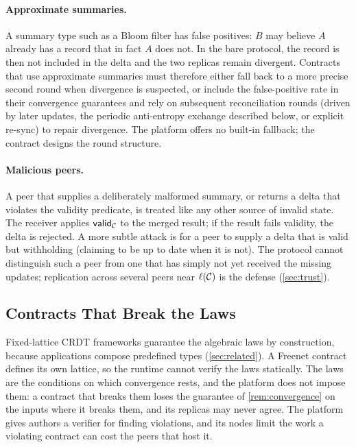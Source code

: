 \paragraph{Approximate summaries.} A summary type such as a Bloom filter has false positives: $B$ may believe $A$ already has a record that in fact $A$ does not. In the bare protocol, the record is then not included in the delta and the two replicas remain divergent. Contracts that use approximate summaries must therefore either fall back to a more precise second round when divergence is suspected, or include the false-positive rate in their convergence guarantees and rely on subsequent reconciliation rounds (driven by later updates, the periodic anti-entropy exchange described below, or explicit re-sync) to repair divergence. The platform offers no built-in fallback; the contract designs the round structure.

\paragraph{Malicious peers.} A peer that supplies a deliberately malformed summary, or returns a delta that violates the validity predicate, is treated like any other source of invalid state. The receiver applies $\mathsf{valid}_{\mathcal{C}}$ to the merged result; if the result fails validity, the delta is rejected. A more subtle attack is for a peer to supply a delta that is valid but withholding (claiming to be up to date when it is not). The protocol cannot distinguish such a peer from one that has simply not yet received the missing updates; replication across several peers near $\ell(\mathcal{C})$ is the defense (\cref{sec:trust}).

\subsection{Contracts That Break the Laws}
\label{sec:conformance}

Fixed-lattice CRDT frameworks guarantee the algebraic laws by construction, because applications compose predefined types (\cref{sec:related}). A Freenet contract defines its own lattice, so the runtime cannot verify the laws statically. The laws are the conditions on which convergence rests, and the platform does not impose them: a contract that breaks them loses the guarantee of \cref{rem:convergence} on the inputs where it breaks them, and its replicas may never agree. The platform gives authors a verifier for finding violations, and its nodes limit the work a violating contract can cost the peers that host it.

